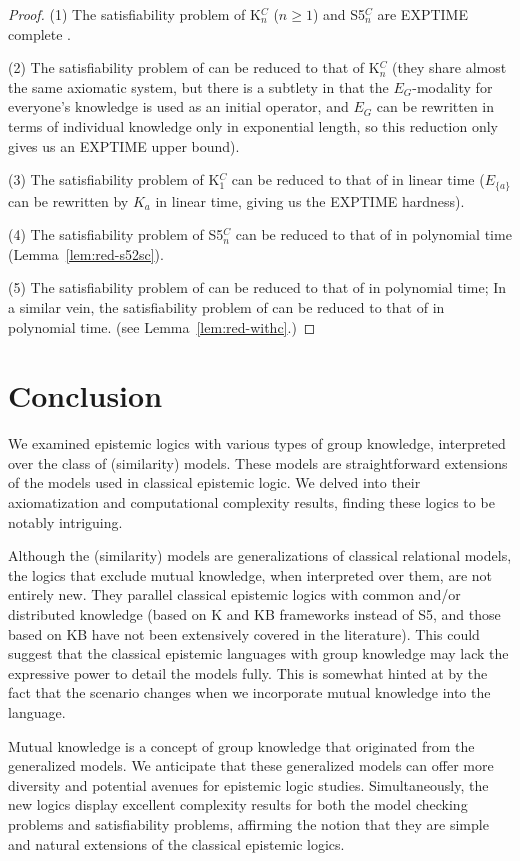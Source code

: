 \documentclass{article}
\newcommand{\lc}{\text{\normalfont ELC}\xspace}
\newcommand{\lcdm}{\text{\normalfont ELCDM}\xspace}
\newcommand{\lsc}{\text{\normalfont ELC$^s$}\xspace}
\newcommand{\lscdm}{\text{\normalfont ELCDM$^s$}\xspace}
\begin{document}
\begin{proof}
(1) The satisfiability problem of K$_n^C$ ($n \geq 1$) and S5$_n^C$ are EXPTIME complete \cite{HM1992}.

(2) The satisfiability problem of \lc can be reduced to that of K$_n^C$ (they share almost the same axiomatic system, but there is a subtlety in that the $E_G$-modality for everyone's knowledge is used as an initial operator, and $E_G$ can be rewritten in terms of individual knowledge only in exponential length, so this reduction only gives us an EXPTIME upper bound).

(3) The satisfiability problem of K$_1^C$ can be reduced to that of \lc in linear time ($E_{\{a\}}$ can be rewritten by $K_a$ in linear time, giving us the EXPTIME hardness).

(4) The satisfiability problem of S5$_n^C$ can be reduced to that of \lsc in polynomial time (Lemma~\ref{lem:red-s52sc}).

(5) The satisfiability problem of \lcdm can be reduced to that of \lc in polynomial time; In a similar vein, the satisfiability problem of \lscdm can be reduced to that of \lsc in polynomial time. (see Lemma~\ref{lem:red-withc}.) 
\end{proof}

\section{Conclusion}

We examined epistemic logics with various types of group knowledge, interpreted over the class of (similarity) models. These models are straightforward extensions of the models used in classical epistemic logic. We delved into their axiomatization and computational complexity results, finding these logics to be notably intriguing.

Although the (similarity) models are generalizations of classical relational models, the logics that exclude mutual knowledge, when interpreted over them, are not entirely new. They parallel classical epistemic logics with common and/or distributed knowledge (based on K and KB frameworks instead of S5, and those based on KB have not been extensively covered in the literature). This could suggest that the classical epistemic languages with group knowledge may lack the expressive power to detail the models fully. This is somewhat hinted at by the fact that the scenario changes when we incorporate mutual knowledge into the language.

Mutual knowledge is a concept of group knowledge that originated from the generalized models. We anticipate that these generalized models can offer more diversity and potential avenues for epistemic logic studies. Simultaneously, the new logics display excellent complexity results for both the model checking problems and satisfiability problems, affirming the notion that they are simple and natural extensions of the classical epistemic logics.
\end{document}
